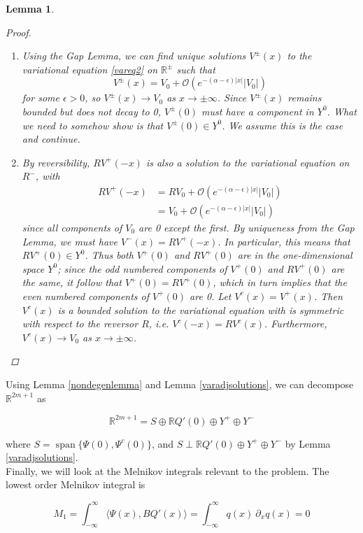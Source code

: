 \documentclass[12pt]{article}
\def\R{{\mathbb R}}
\DeclareMathOperator{\spn}{span}
\newtheorem{lemma}{Lemma}
\begin{document}
\begin{lemma}
\begin{proof}
\begin{enumerate}
\item Using the Gap Lemma, we can find unique solutions $V^\pm(x)$ to the variational equation \eqref{vareq2} on $\R^\pm$ such that
\[
V^\pm(x) = V_0 + \mathcal{O}(e^{-(\alpha - \epsilon)|x|}|V_0|)
\]
for some $\epsilon > 0$, so $V^\pm(x) \rightarrow V_0$ as $x \rightarrow \pm \infty$. Since $V^\pm(x)$ remains bounded but does not decay to 0, $V^\pm(0)$ must have a component in $Y^0$. What we need to somehow show is that $V^\pm(0) \in Y^0$. We assume this is the case and continue.

\item By reversibility, $RV^+(-x)$ is also a solution to the variational equation on $R^-$, with 
\begin{align*}
R V^+(-x) &= R V_0 + \mathcal{O}(e^{-(\alpha - \epsilon)|x|}|V_0|) \\
&= V_0 + \mathcal{O}(e^{-(\alpha - \epsilon)|x|}|V_0|)
\end{align*}
since all components of $V_0$ are 0 except the first. By uniqueness from the Gap Lemma, we must have $V^-(x) = RV^+(-x)$. In particular, this means that $RV^+(0) \in Y^0$. Thus both $V^+(0)$ and $RV^+(0)$ are in the one-dimensional space $Y^0$; since the odd numbered components of $V^+(0)$ and $RV^+(0)$ are the same, it follow that $V^+(0) = RV^+(0)$, which in turn implies that the even numbered components of $V^+(0)$ are 0. Let $V^c(x) = V^+(x)$. Then $V^c(x)$ is a bounded solution to the variational equation with is symmetric with respect to the reversor $R$, i.e. $V^c(-x) = RV^c(x)$. Furthermore, $V^c(x) \rightarrow V_0$ as $x \rightarrow \pm \infty$.

\end{enumerate}
\end{proof}
\end{lemma}

Using Lemma \ref{nondegenlemma} and Lemma \ref{varadjsolutions}, we can decompose $\R^{2m+1}$ as  

\begin{equation}
\R^{2m+1} = S \oplus \R Q'(0) \oplus Y^+ \oplus Y^-
\end{equation}

where $S = \spn\{ \Psi(0), \Psi^c(0) \}$, and $S \perp \R Q'(0) \oplus Y^+ \oplus Y^-$ by Lemma \ref{varadjsolutions}.\\

Finally, we will look at the Melnikov integrals relevant to the problem. The lowest order Melnikov integral is

\begin{equation}\label{M1}
M_1 = \int_{-\infty}^\infty \langle \Psi(x), B Q'(x) \rangle =
\int_{-\infty}^\infty q(x) \: \partial_x q(x) = 0
\end{equation}
\end{document}
